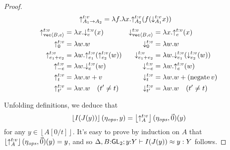 \documentclass{sigplanconf}
\newcommand{\tyPrim}[2]{\textup{\texttt{#1}}\langle #2 \rangle}
\newcommand{\tmSem}[1]{\left\lfloor{#1}\right\rfloor}
\theoremstyle{examplestyle}
\theoremstyle{restatementstyle}
\begin{document}
\begin{proof}
\begin{align*}
\mathord\uparrow_{A_1\to A_2}^{t\mathord:v} &= \lambda f. \lambda x. \mathord\uparrow_{A_2}^{t\mathord:v} (f(\mathord\downarrow_{A_1}^{t\mathord:v} x))
\end{align*}
\begin{align*}
\transup{\tyPrim{vec}{B,e}} t v &= \lambda x. \transdn{e}  t v (x) 
&
\transdn{\tyPrim{vec}{B,e}} t v &= \lambda x. \transup{e} t v (x)
\\
\transup{0} t v &= \lambda w.w
&
\transdn{0} t v &= \lambda w.w
\\ 
\transup{e_1+e_2} t v &= \lambda w.\transup{e_1} t v(\transup{e_2} t v(w))
&
\transdn{e_1+e_2} t v &= \lambda w.\transdn{e_1} t v(\transdn{e_2} t v(w))
\\
\transup{-e} t v &= \lambda w.\transdn{e} t v (w)
&
\transdn{-e} t v &= \lambda w.\transup{e} t v (w)
\\
\transup{t} t v &= \lambda w.w + v 
&
\transdn{t} t v &= \lambda w.w + (\mathrm{negate}\, v)
\\
\transup{t'} t v &= \lambda w.w\quad(t'\neq t)
&
\transdn{t'} t v &= \lambda w.w\quad(t'\neq t)
\end{align*}


Unfolding definitions, we deduce that
\[
\tmSem{I(J(y))}(\opsEnv,y) = \tmSem{\transup A t v}(\opsEnv,\vec 0)(y)
\]
for any $y \in \tmSem{A[0/t]}$. It's easy to prove by induction on $A$
that $\tmSem{\transup A t v}(\opsEnv,\vec 0)(y) = y$, and so
${\Delta,B\mathord:\mathsf{GL}_2};{y\mathord:Y}\vdash{I(J(y))}\approx{y}:{Y}$ follows.


\end{proof}
\end{document}
